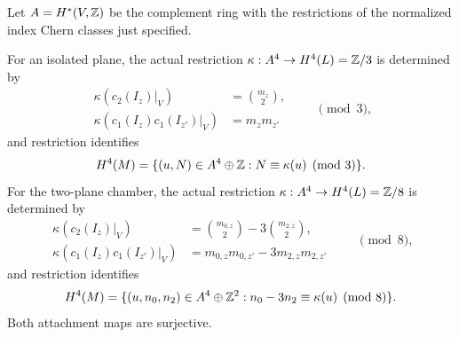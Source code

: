 \begin{proposition}\label{prop:calculated-attachments}
Let $A=H^*(V,\mathbb Z)$ be the complement ring with the
restrictions of the normalized index Chern classes
just specified.

For an isolated plane, the actual restriction
$\kappa:A^4\to H^4(L)=\mathbb Z/3$ is determined by
\begin{equation}\label{eq:mod-three-generators}
 \begin{aligned}
 \kappa(c_2(I_z)|_V)&=\binom{m_z}{2},\\
 \kappa(c_1(I_z)c_1(I_{z'})|_V)&=m_zm_{z'}
 \end{aligned}\qquad\pmod3,
\end{equation}
and restriction identifies
\begin{equation}\label{eq:mod-three-gluing}
 H^4(M)=\{(u,N)\in A^4\oplus\mathbb Z:
                      N\equiv\kappa(u)\pmod3\}.
\end{equation}
For the two-plane chamber, the actual restriction
$\kappa:A^4\to H^4(L)=\mathbb Z/8$ is determined by
\begin{equation}\label{eq:mod-eight-generators}
 \begin{aligned}
 \kappa(c_2(I_z)|_V)
   &=\binom{m_{0,z}}2-3\binom{m_{2,z}}2,\\
 \kappa(c_1(I_z)c_1(I_{z'})|_V)
   &=m_{0,z}m_{0,z'}-3m_{2,z}m_{2,z'}
 \end{aligned}\qquad\pmod8,
\end{equation}
and restriction identifies
\begin{equation}\label{eq:mod-eight-gluing}
 H^4(M)=\{(u,n_0,n_2)\in A^4\oplus\mathbb Z^2:
           n_0-3n_2\equiv\kappa(u)\pmod8\}.
\end{equation}
Both attachment maps are surjective.
\end{proposition}

